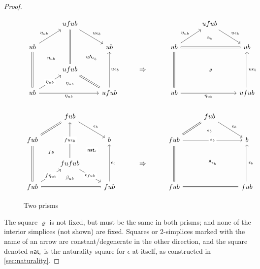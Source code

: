 \documentclass[12pt]{amsart}
\theoremstyle{plain}
\theoremstyle{definition}
\theoremstyle{remark}
\numberwithin{equation}{section}
\newcommand{\connmin}[1]{\mathsf{\Lambda}_{#1}}
\begin{document}
\begin{proof}
  \begin{figure}
    \centering
    \[
  \begin{tikzcd}
    & ufub \ar[dr,"u\epsilon_b"] & & &     & ufub \ar[dr,"u\epsilon_b"] \ar[d,phantom,"\scriptstyle \alpha_b"]\\
    ub \ar[ur,"\eta_{ub}"] && ub & &     ub \ar[ur,"\eta_{ub}"] \ar[rr,equals] & ~ & ub\\
    & ufub \ar[dr,equals] \ar[uu,equals] \ar[ur,phantom,"\scriptstyle{u\connmin{\epsilon_b}}"] \ar[d,phantom,"\scriptstyle \eta_{ub}"]   & &  \Rightarrow  & & \\
    ub \ar[ur,"\eta_{ub}" description] \ar[rr,"\eta_{ub}"'] \ar[uu,equals] \ar[ruuu,phantom,"\scriptstyle\eta_{ub}"] &~& ufub\ar[uu,"u\epsilon_b"'] & & ub \ar[rr,"\eta_{ub}"'] \ar[uu,equals] \ar[rruu,phantom,"\scriptstyle \varrho"] && ufub\ar[uu,"u\epsilon_b"']\\    & fub \ar[dr,"\epsilon_b"] & & &     & fub \ar[dr,"\epsilon_b"] \ar[d,phantom,"\scriptstyle \epsilon_b"]\\
    fub \ar[ur,equals] && b & &     fub \ar[ur,equals] \ar[rr,"\epsilon_b" description] & ~ & b\\
    & fufub \ar[dr,"\epsilon_{fub}" description] \ar[uu,"fu\epsilon_b" description] \ar[ur,phantom,"\scriptstyle \mathsf{nat}_\epsilon" description] \ar[d,phantom,"\scriptstyle \beta_{ub}"] & & \Rightarrow & &\\
    fub \ar[ur,"f\eta_{ub}" description] \ar[rr,equals] \ar[uu,equals] \ar[ruuu,phantom,"\scriptstyle f\varrho"] &~& fub\ar[uu,"\epsilon_b"'] & & 
    fub \ar[rr,equals] \ar[uu,equals] \ar[rruu,phantom,"\scriptstyle \connmin{\epsilon_b}"] && fub\ar[uu,"\epsilon_b"']
  \end{tikzcd}
  \]
    \caption{Two prisms}
    \label{fig:two-prisms}
  \end{figure}
  The square $\varrho$ is not fixed, but must be the same in both prisms; and none of the interior simplices (not shown) are fixed.
  Squares or 2-simplices marked with the name of an arrow are constant/degenerate in the other direction, and the square denoted $\mathsf{nat}_\epsilon$ is the naturality square for $\epsilon$ at itself, as constructed in \cref{sec:naturality}.


\end{proof}
\end{document}
